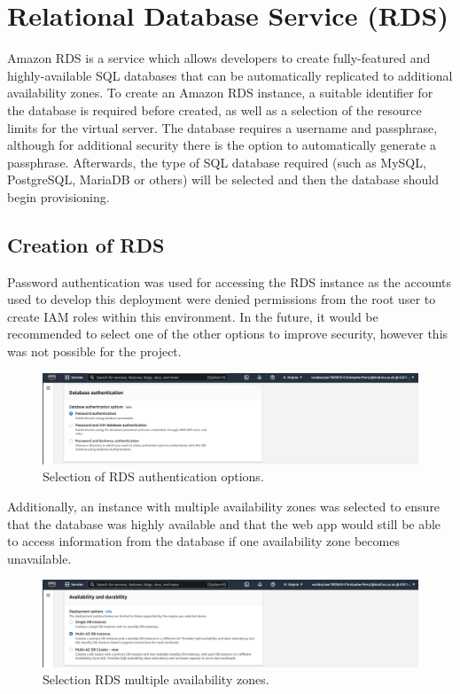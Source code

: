 \chapter{Relational Database Service (RDS)}\label{ch:relational-database-service}

Amazon RDS is a service which allows developers to create fully-featured and highly-available SQL databases that can be
automatically replicated to additional availability zones.
To create an Amazon RDS instance, a suitable identifier for the database is required before created, as well as a
selection of the resource limits for the virtual server.
The database requires a username and passphrase, although for additional security there is the option to automatically
generate a passphrase.
Afterwards, the type of SQL database required (such as MySQL, PostgreSQL, MariaDB or others) will be selected and then
the database should begin provisioning.

\section{Creation of RDS}\label{sec:creation-of-rds}
Password authentication was used for accessing the RDS instance as the accounts used to develop this deployment were
denied permissions from the root user to create IAM roles within this environment.
In the future, it would be recommended to select one of the other options to improve security, however this was not
possible for the project.

\begin{figure}[!htbp]
    \centering
    \includegraphics[width=\textwidth]{resources/rds/rds-authentication}
    \caption{Selection of RDS authentication options.}
    \label{fig:rds-auth}
\end{figure}

\clearpage
Additionally, an instance with multiple availability zones was selected to ensure that the database was highly
available and that the web app would still be able to access information from the database if one availability
zone becomes unavailable.

\begin{figure}[!htbp]
    \centering
    \includegraphics[width=\textwidth]{resources/rds/rds-availability-durability}
    \caption{Selection RDS multiple availability zones.}
    \label{fig:rds-avail}
\end{figure}

